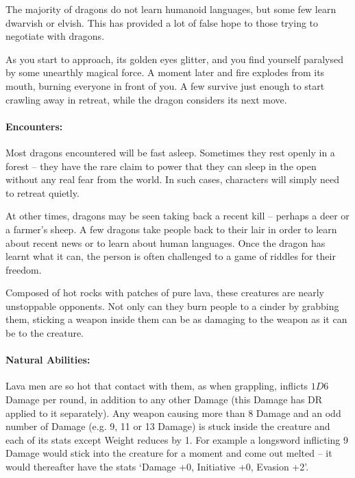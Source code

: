 \begin{multicols}{2}
The majority of dragons do not learn humanoid languages, but some few learn dwarvish or elvish.
This has provided a lot of false hope to those trying to negotiate with dragons.

\begin{boxtext}

  As you start to approach, its golden eyes glitter, and you find yourself paralysed by some unearthly magical force.
A moment later and fire explodes from its mouth, burning everyone in front of you.
  A few survive just enough to start crawling away in retreat, while the dragon considers its next move.

\end{boxtext}

\paragraph{Encounters:} Most dragons encountered will be fast asleep.
Sometimes they rest openly in a forest -- they have the rare claim to power that they can sleep in the open without any real fear from the world.
In such cases, characters will simply need to retreat quietly.

At other times, dragons may be seen taking back a recent kill -- perhaps a deer or a farmer's sheep.
A few dragons take people back to their lair in order to learn about recent news or to learn about human languages.
Once the dragon has learnt what it can, the person is often challenged to a game of riddles for their freedom.  

\dragon

\label{lavaman}

Composed of hot rocks with patches of pure lava, these creatures are nearly unstoppable opponents.  Not only can they burn people to a cinder by grabbing them, sticking a weapon inside them can be as damaging to the weapon as it can be to the creature.

\paragraph{Natural Abilities:} Lava men are so hot that contact with them, as when grappling, inflicts $1D6$ Damage per round, in addition to any other Damage (this Damage has DR applied to it separately).
Any weapon causing more than 8 Damage and an odd number of Damage (e.g. 9, 11 or 13 Damage) is stuck inside the creature and each of its stats except Weight reduces by 1.
For example a longsword inflicting 9 Damage would stick into the creature for a moment and come out melted -- it would thereafter have the stats `Damage +0, Initiative +0, Evasion +2'.


\end{multicols}
